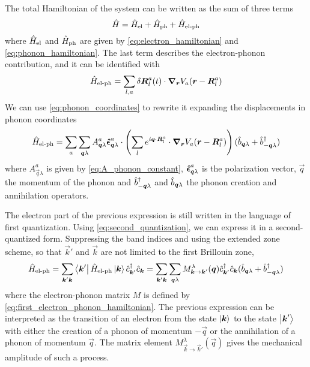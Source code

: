 The total Hamiltonian of the system can be written as the sum of three terms
\begin{equation}
    \hat{H} = \hat{H}_\text{el} + \hat{H}_\text{ph} + \hat{H}_\text{el-ph}
\end{equation}
where $\hat{H}_\text{el}$ and $\hat{H}_\text{ph}$ are given by \cref{eq:electron_hamiltonian} and \cref{eq:phonon_hamiltonian}. The last term describes the  electron-phonon contribution, and it can be identified with
\begin{equation}
    \hat{H}_\text{el-ph} = \sum_{l,a} \delta \mathbf{\boldsymbol{R}}_l^a(t) \cdot \grad_{\mathbf{\boldsymbol{r}}} V_a(\mathbf{\boldsymbol{r}} - \mathbf{\boldsymbol{R}}_l^a)
\end{equation}
We can use \cref{eq:phonon_coordinates} to rewrite it expanding the displacements in phonon coordinates
\begin{equation} \label{eq:first_electron_phonon_hamiltonian}
    \hat{H}_\text{el-ph} = \sum_{a} \sum_{\mathbf{\boldsymbol{q}}\lambda} A_{\mathbf{\boldsymbol{q}}\lambda}^a \mathbf{\boldsymbol{\hat{\epsilon}}}_{\mathbf{\boldsymbol{q}}\lambda}^a \cdot \left( \sum_l e^{i\mathbf{\boldsymbol{q}} \cdot \mathbf{\boldsymbol{R}}_l^a}   \cdot \grad_{\mathbf{\boldsymbol{r}}} V_a(\mathbf{\boldsymbol{r}} - \mathbf{\boldsymbol{R}}_l^a) \right) (\hat{b}_{\mathbf{\boldsymbol{q}}\lambda} + \hat{b}^\dagger_{-\mathbf{\boldsymbol{q}}\lambda})
\end{equation}
where $A_{\vec{q}\lambda}^a$ is given by \cref{eq:A_phonon_constant}, $\mathbf{\boldsymbol{\hat{\epsilon}}}_{\mathbf{\boldsymbol{q}}\lambda}^a$ is the polarization vector, $\vec{q}$ the momentum of the phonon and $\hat{b}^\dagger_{-\mathbf{\boldsymbol{q}}\lambda}$ and $\hat{b}_{\mathbf{\boldsymbol{q}}\lambda}$ the phonon creation and annihilation operators.

The electron part of the previous expression is still written in the language of first quantization. Using \cref{eq:second_quantization}, we can express it in a second-quantized form. Suppressing the band indices and using the extended zone scheme, so that $\vec{k}'$ and $\vec{k}$ are not limited to the first Brillouin zone,
\begin{equation} \label{eq:general_electron_phonon_hamiltonian}
    \hat{H}_\text{el-ph} = \sum_{\mathbf{\boldsymbol{k}}'\mathbf{\boldsymbol{k}}} \bra{\mathbf{\boldsymbol{k}}'} \hat{H}_\text{el-ph} \ket{\mathbf{\boldsymbol{k}}} \hat{c}^\dagger_{\mathbf{\boldsymbol{k}}'}\hat{c}_{\mathbf{\boldsymbol{k}}}
    = \sum_{\mathbf{\boldsymbol{k}}'\mathbf{\boldsymbol{k}}} \sum_{\mathbf{\boldsymbol{q}}\lambda} M_{\mathbf{\boldsymbol{k}} \rightarrow \mathbf{\boldsymbol{k}}'}^\lambda(\mathbf{\boldsymbol{q}}) \hat{c}^\dagger_{\mathbf{\boldsymbol{k}}'}\hat{c}_{\mathbf{\boldsymbol{k}}} (\hat{b}_{\mathbf{\boldsymbol{q}}\lambda} + \hat{b}^\dagger_{-\mathbf{\boldsymbol{q}}\lambda})
\end{equation}
where the electron-phonon matrix $M$ is defined by \cref{eq:first_electron_phonon_hamiltonian}. The previous expression can be interpreted as the transition of an electron from the state $\ket{\mathbf{\boldsymbol{k}}}$ to the state $\ket{\mathbf{\boldsymbol{k}}'}$ with either the creation of a phonon of momentum $-\vec{q}$ or the annihilation of a phonon of momentum $\vec{q}$. The matrix element $M_{\vec{k} \rightarrow \vec{k}'}^\lambda(\vec{q})$ gives the mechanical amplitude of such a process.

